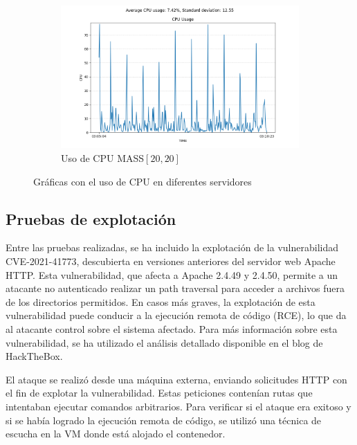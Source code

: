 \begin{figure}[H]
        \begin{subfigure}[H]{0.45\textwidth}
            \centering
            \includegraphics[width=\textwidth]{./imagenes/mtd-no-petition_u20_l20.csv.png} 
            \caption{Uso de CPU MASS$[20,20]$}
            \label{fig:imagen5}
        \end{subfigure}
        \caption{Gráficas con el uso de CPU en diferentes servidores}
    \end{figure}
    
    

\subsection{Pruebas de explotación}
Entre las pruebas realizadas, se ha incluido la explotación de la vulnerabilidad CVE-2021-41773, descubierta en versiones anteriores del servidor web Apache HTTP. Esta vulnerabilidad, que afecta a Apache 2.4.49 y 2.4.50, permite a un atacante no autenticado realizar un path traversal para acceder a archivos fuera de los directorios permitidos. En casos más graves, la explotación de esta vulnerabilidad puede conducir a la ejecución remota de código (RCE), lo que da al atacante control sobre el sistema afectado. Para más información sobre esta vulnerabilidad, se ha utilizado el análisis detallado disponible en el blog de HackTheBox\cite{cve-2021-41773}.

El ataque se realizó desde una máquina externa, enviando solicitudes HTTP con el fin de explotar la vulnerabilidad. Estas peticiones contenían rutas que intentaban ejecutar comandos arbitrarios. Para verificar si el ataque era exitoso y si se había logrado la ejecución remota de código, se utilizó una técnica de escucha en la VM donde está alojado el contenedor.

